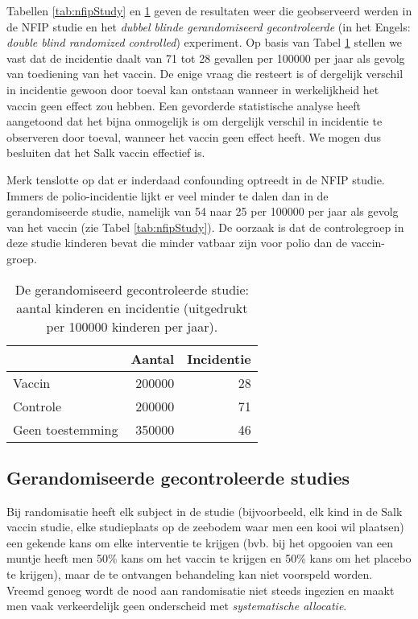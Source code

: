 \documentclass[
  12pt,dutch,coursenotes]{book}
\theoremstyle{definition}
\theoremstyle{definition}
\theoremstyle{definition}
\theoremstyle{remark}
\begin{document}
Tabellen \ref{tab:nfipStudy} en \ref{tab:dbrcStudy} geven de resultaten weer die geobserveerd
werden in de NFIP studie en het \emph{dubbel blinde gerandomiseerd
gecontroleerde} (in het Engels: \emph{double blind randomized controlled})
experiment. Op basis van Tabel \ref{tab:dbrcStudy} stellen we vast dat de incidentie
daalt van 71 tot 28 gevallen per 100000 per jaar als gevolg van
toediening van het vaccin. De enige vraag die resteert is of dergelijk
verschil in incidentie gewoon door toeval kan ontstaan wanneer in
werkelijkheid het vaccin geen effect zou hebben. Een gevorderde statistische analyse heeft aangetoond dat het bijna onmogelijk is om dergelijk verschil in incidentie
te observeren door toeval, wanneer het vaccin geen effect heeft. We mogen
dus besluiten dat het Salk vaccin effectief is.

Merk tenslotte op dat er inderdaad confounding optreedt in de NFIP studie. Immers
de polio-incidentie lijkt er veel minder te dalen dan in de gerandomiseerde studie, namelijk van 54 naar 25
per 100000 per jaar als gevolg van het vaccin (zie Tabel \ref{tab:nfipStudy}). De oorzaak is dat
de controlegroep in deze studie kinderen bevat die minder vatbaar zijn voor
polio dan de vaccin-groep.

\begin{table}

\caption{\label{tab:dbrcStudy}De gerandomiseerd gecontroleerde studie: aantal kinderen en incidentie (uitgedrukt per
100000 kinderen per jaar).}
\centering
\begin{tabular}[t]{lrr}
\toprule
  & Aantal & Incidentie\\
\midrule
Vaccin & 200000 & 28\\
Controle & 200000 & 71\\
Geen toestemming & 350000 & 46\\
\bottomrule
\end{tabular}
\end{table}

\hypertarget{gerandomiseerde-gecontroleerde-studies}{%
\subsection{Gerandomiseerde gecontroleerde studies}\label{gerandomiseerde-gecontroleerde-studies}}

Bij randomisatie heeft elk subject in de studie (bijvoorbeeld, elk kind in de Salk vaccin studie, elke studieplaats op de zeebodem waar men een kooi wil plaatsen) een gekende kans om elke interventie te krijgen (bvb. bij het opgooien van een muntje heeft men 50\% kans om het
vaccin te krijgen en 50\% kans om het placebo te krijgen), maar de te
ontvangen behandeling kan niet voorspeld worden. Vreemd genoeg wordt de nood
aan randomisatie niet steeds ingezien en maakt men vaak verkeerdelijk geen
onderscheid met \emph{systematische allocatie}.
\end{document}
